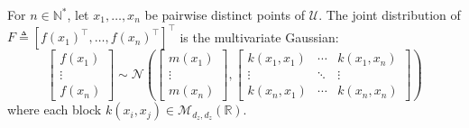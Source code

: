 \begin{proposition}\label{th:GP_marginals}
	For $n\in\mathbb{N}^*$, let $x_1,\dots,x_n$ be pairwise distinct points of $\mathcal{U}$. The joint distribution of $F\triangleq\left[f(x_1)^\top,\dots,f(x_n)^\top\right]^\top$ is the multivariate Gaussian:
	\begin{equation}
		\begin{bmatrix}
		f(x_1)\\\vdots\\f(x_n)
		\end{bmatrix}\sim\mathcal{N}\left(\begin{bmatrix}
		m(x_1)\\\vdots\\m(x_n)
		\end{bmatrix},\begin{bmatrix}
		k(x_1,x_1)&\cdots&k(x_1,x_n)\\\vdots&\ddots&\vdots\\k(x_n,x_1)&\cdots&k(x_n,x_n)
		\end{bmatrix}\right)\label{eq:GP_marginals}
	\end{equation}
	where each block $k(x_i,x_j)\in\mathcal{M}_{d_z,d_z}(\mathbb{R})$.
\end{proposition}

